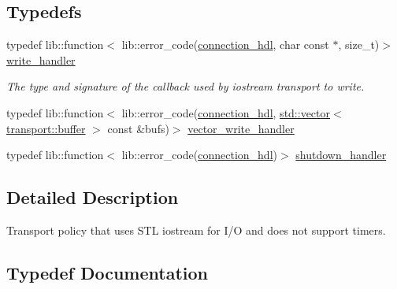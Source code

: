 \subsection*{Typedefs}
\begin{DoxyCompactItemize}
\item 
\mbox{\label{namespacewebsocketpp_1_1transport_1_1iostream_abc22b834c2d0c698d6c87e51d5bfad2c}} 
typedef lib\+::function$<$ lib\+::error\+\_\+code(\mbox{\hyperlink{namespacewebsocketpp_a6b3d26a10ee7229b84b776786332631d}{connection\+\_\+hdl}}, char const $\ast$, size\+\_\+t)$>$ \mbox{\hyperlink{namespacewebsocketpp_1_1transport_1_1iostream_abc22b834c2d0c698d6c87e51d5bfad2c}{write\+\_\+handler}}
\begin{DoxyCompactList}\small\item\em The type and signature of the callback used by iostream transport to write. \end{DoxyCompactList}\item 
typedef lib\+::function$<$ lib\+::error\+\_\+code(\mbox{\hyperlink{namespacewebsocketpp_a6b3d26a10ee7229b84b776786332631d}{connection\+\_\+hdl}}, \mbox{\hyperlink{classstd_1_1vector}{std\+::vector}}$<$ \mbox{\hyperlink{structwebsocketpp_1_1transport_1_1buffer}{transport\+::buffer}} $>$ const \&bufs)$>$ \mbox{\hyperlink{namespacewebsocketpp_1_1transport_1_1iostream_a21982146513c0b5580786c3af5dd2878}{vector\+\_\+write\+\_\+handler}}
\item 
typedef lib\+::function$<$ lib\+::error\+\_\+code(\mbox{\hyperlink{namespacewebsocketpp_a6b3d26a10ee7229b84b776786332631d}{connection\+\_\+hdl}})$>$ \mbox{\hyperlink{namespacewebsocketpp_1_1transport_1_1iostream_a3563ce2cca06b1466f7d76ecb8eb4a0b}{shutdown\+\_\+handler}}
\end{DoxyCompactItemize}


\subsection{Detailed Description}
Transport policy that uses S\+TL iostream for I/O and does not support timers. 

\subsection{Typedef Documentation}
\mbox{\label{namespacewebsocketpp_1_1transport_1_1iostream_a3563ce2cca06b1466f7d76ecb8eb4a0b}} 
